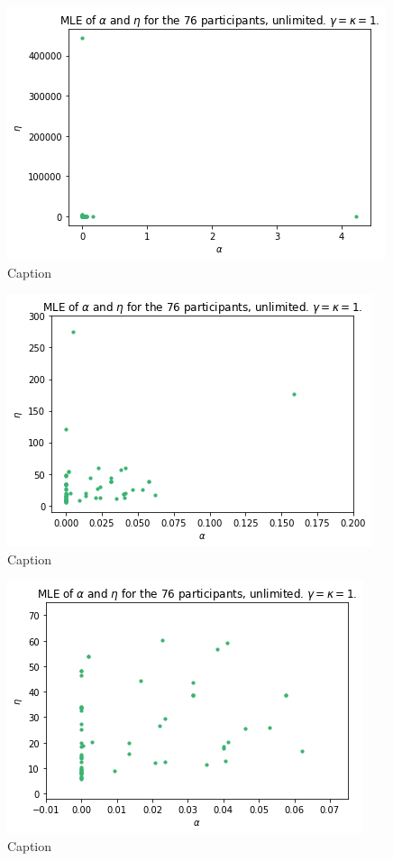 \begin{figure}
    \centering
    \includegraphics[scale=0.7]{pictures/plotted_mles_unlim_gk1.png}
    \caption[All MLEs plotted, unlimited]{Caption}
    \label{fig:plot_all_mles_unlim_zoom0}
\end{figure}

\begin{figure}
    \centering
    \includegraphics[scale=0.7]{pictures/plotted_mles_unlim_gk1_zoom1.png}
    \caption[Some MLEs plotted, unlimited]{Caption}
    \label{fig:plot_all_mles_unlim_zoom1}
\end{figure}

\begin{figure}
    \centering
    \includegraphics[scale=0.7]{pictures/plotted_mles_unlim_gk1_zoom2.png}
    \caption[Some MLEs plotted, unlimited]{Caption}
    \label{fig:plot_all_mles_unlim_zoom2}
\end{figure}


